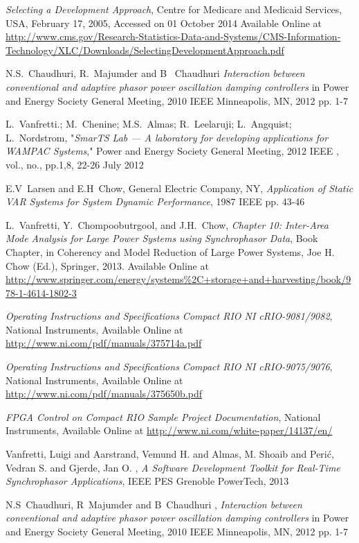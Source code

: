 \documentclass[conference]{IEEEtran}
\begin{document}
\begin{thebibliography}{1}
 \emph{Selecting a Development Approach}, Centre for Medicare and Medicaid Services, USA, February 17, 2005, Accessed on 01 October 2014 Available Online at \url{http://www.cms.gov/Research-Statistics-Data-and-Systems/CMS-Information-Technology/XLC/Downloads/SelectingDevelopmentApproach.pdf}

 N.S.~Chaudhuri, R.~Majumder and B~ Chaudhuri \emph{Interaction between conventional and adaptive phasor power oscillation damping controllers} in Power and Energy Society General Meeting, 2010 IEEE Minneapolis, MN, 2012 pp. 1-7

 L.~Vanfretti.; M.~Chenine; M.S.~Almas; R.~Leelaruji; L.~Angquist; L.~Nordstrom, "\emph{SmarTS Lab — A laboratory for developing applications for WAMPAC Systems}," Power and Energy Society General Meeting, 2012 IEEE , vol., no., pp.1,8, 22-26 July 2012

 E.V~Larsen and E.H~Chow, General Electric Company, NY, \emph{Application of Static VAR Systems for System Dynamic Performance}, 1987 IEEE pp. 43-46

  L.~Vanfretti, Y.~Chompoobutrgool, and J.H.~Chow, \emph{Chapter 10: Inter-Area Mode Analysis for Large Power Systems using Synchrophasor Data}, Book Chapter, in Coherency and Model Reduction of Large Power Systems, Joe H. Chow (Ed.), Springer, 2013. Available Online at \url{http://www.springer.com/energy/systems%2C+storage+and+harvesting/book/978-1-4614-1802-3}

 \emph{Operating Instructions and Specifications Compact RIO NI cRIO-9081/9082}, National Instruments, Available Online at \url{http://www.ni.com/pdf/manuals/375714a.pdf}
  
 \emph{Operating Instructions and Specifications Compact RIO NI cRIO-9075/9076}, National Instruments, Available Online at \url{http://www.ni.com/pdf/manuals/375650b.pdf}

 \emph{FPGA Control on Compact RIO Sample Project Documentation}, National Instruments, Available Online at \url{http://www.ni.com/white-paper/14137/en/}

 Vanfretti, Luigi and Aarstrand, Vemund H. and Almas, M. Shoaib and Peri\'c, Vedran S. and Gjerde, Jan O. , \emph{A Software Development Toolkit for Real-Time Synchrophasor Applications},  IEEE PES Grenoble PowerTech, 2013

 N.S~Chaudhuri, R~Majumder and B~Chaudhuri , \emph{Interaction between conventional and adaptive phasor power oscillation damping controllers} in Power and Energy Society General Meeting, 2010 IEEE Minneapolis, MN, 2012 pp. 1-7


\end{thebibliography}
\end{document}

